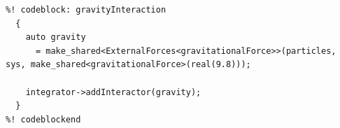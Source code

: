 \begin{lstlisting}
%! codeblock: gravityInteraction
  {
    auto gravity
      = make_shared<ExternalForces<gravitationalForce>>(particles, sys, make_shared<gravitationalForce>(real(9.8)));

    integrator->addInteractor(gravity);
  }
%! codeblockend
\end{lstlisting}

